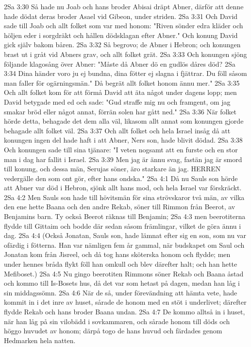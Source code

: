 2Sa 3:30  Så hade nu Joab och hans broder Abisai dräpt Abner, därför att denne hade dödat deras broder Asael vid Gibeon, under striden.
2Sa 3:31  Och David sade till Joab och allt folket som var med honom: "Riven sönder edra kläder och höljen eder i sorgdräkt och hållen dödsklagan efter Abner." Och konung David gick själv bakom båren.
2Sa 3:32  Så begrovo; de Abner i Hebron; och konungen brast ut i gråt vid Abners grav, och allt folket grät.
2Sa 3:33  Och konungen sjöng följande klagosång över Abner: "Måste då Abner dö en gudlös dåres död?
2Sa 3:34  Dina händer voro ju ej bundna, dina fötter ej slagna i fjättrar. Du föll såsom man faller för ogärningsmän." Då begrät allt folket honom ännu mer."
2Sa 3:35  Och allt folket kom för att förmå David att äta något under dagens lopp; men David betygade med ed och sade: "Gud straffe mig nu och framgent, om jag smakar bröd eller något annat, förrän solen har gått ned."
2Sa 3:36  När folket hörde detta, behagade det dem alla väl, likasom allt annat som konungen gjorde behagade allt folket väl.
2Sa 3:37  Och allt folket och hela Israel insåg då att konungen ingen del hade haft i att Abner, Ners son, hade blivit dödad.
2Sa 3:38  Och konungen sade till sina tjänare: "I veten nogsamt att en furste och en stor man i dag har fallit i Israel.
2Sa 3:39  Men jag är ännu svag, fastän jag är smord till konung, och dessa män, Serujas söner, äro starkare än jag. HERREN vedergälle den som ont gör, efter hans ondska."
2Sa 4:1  Då nu Sauls son hörde att Abner var död i Hebron, sjönk allt hans mod, och hela Israel var förskräckt.
2Sa 4:2  Men Sauls son hade till hövitsmän för sina strövskaror två män, av vilka den ene hette Baana och den andre Rekab, söner till Rimmon från Beerot, av Benjamins barn. Ty också Beerot räknas till Benjamin;
2Sa 4:3  men beerotiterna flydde till Gittaim och bodde där sedan såsom främlingar, vilket de göra ännu i dag.
2Sa 4:4  (Också Jonatan, Sauls son, hade lämnat efter sig en son, som nu var ofärdig i fötterna. Han var nämligen fem år gammal, när budskapet om Saul och Jonatan kom från Jisreel, och då tog hans sköterska honom och flydde; men under hennes bråda flykt föll han omkull och blev därefter halt; och han hette Mefiboset.)
2Sa 4:5  Nu gingo beerotiten Rimmons söner Rekab och Baana åstad och kommo till Is-Bosets hus, då det var som hetast på dagen, medan han låg i sin middagssömn.
2Sa 4:6  När de så, under förevändning att hämta vete, hade kommit in i det inre av huset, sårade de honom med en stöt i underlivet; därefter flydde Rekab och hans broder Baana undan.
2Sa 4:7  De kommo alltså in i huset, när han låg på sin vilobädd i sovkammaren, och sårade honom till döds och höggo huvudet av honom; därpå togo de hans huvud och färdades genom Hedmarken hela natten.
